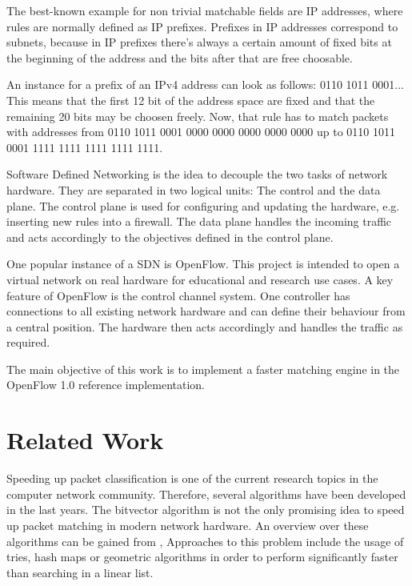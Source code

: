 \documentclass[a4paper,
		12pt,
		parskip=full,
		titlepage
		]{scrartcl}
\begin{document}
The best-known example for non trivial matchable fields are IP addresses, where rules are normally defined as IP prefixes.
Prefixes in IP addresses correspond to subnets, because in IP prefixes there's always a certain amount of fixed bits at the beginning of the address
and the bits after that are free choosable. %

An instance for a prefix of an IPv4 address can look as follows:
0110 1011 0001...
This means that the first 12 bit of the address space are fixed and that the remaining 20 bits may be choosen freely.
Now, that rule has to match packets with addresses from 0110 1011 0001 0000 0000 0000 0000 0000 up to
0110 1011 0001 1111 1111 1111 1111 1111. %

Software Defined Networking is the idea to decouple the two tasks of network hardware. %
They are separated in two logical units: The control and the data plane.
The control plane is used for configuring and updating the hardware, e.g. inserting new rules into a firewall.
The data plane handles the incoming traffic and acts accordingly to the objectives defined in the control plane.

One popular instance of a SDN is OpenFlow.
This project is intended to open a virtual network on real hardware for educational and research use cases.
A key feature of OpenFlow is the control channel system.
One controller has connections to all existing network hardware and can define their behaviour from a central position.
The hardware then acts accordingly and handles the traffic as required.

The main objective of this work is to implement a faster matching engine in the OpenFlow 1.0 reference implementation.

\section{Related Work}
Speeding up packet classification is one of the current research topics in the computer network community.
Therefore, several algorithms have been developed in the last years.
The bitvector algorithm is not the only promising idea to speed up packet matching in modern network hardware.
An overview over these algorithms can be gained from \cite{algorithms_survey},
Approaches to this problem include the usage of tries, hash maps or geometric algorithms\cite{hicuts}
in order to perform significantly faster than searching in a linear list.
\end{document}
